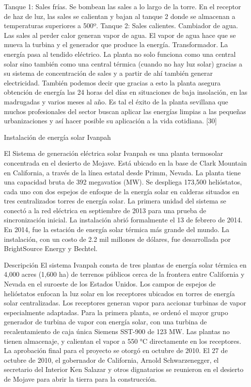 \documentclass[12pt]{article}
\begin{document}
Tanque 1: Sales frías.
Se bombean las sales a lo largo de la torre.
En el receptor de haz de luz, las sales se calientan y bajan al tanque 2 donde se almacenan a temperaturas superiores a 500º.
Tanque 2: Sales calientes.
Cambiador de agua.
Las sales al perder calor generan vapor de agua.
El vapor de agua hace que se mueva la turbina y el generador que produce la energía.
Transformador. La energía pasa al tendido eléctrico.
La planta no solo funciona como una central solar sino también como una central térmica (cuando no hay luz solar) gracias a su sistema de concentración de sales y a partir de ahí también generar electricidad. También podemos decir que gracias a esto la planta asegura obtención de energía las 24 horas del días en situaciones de baja insolación, en las madrugadas y varios meses al año.
Es tal el éxito de la planta sevillana que muchos profesionales del sector buscan aplicar las energías limpias a las pequeñas urbanizaciones y así hacer posible su aplicación a la vida cotidiana. [30]



Instalación de energía solar Ivanpah

El Sistema de generación eléctrica solar Ivanpah es una planta termosolar concentrada en el desierto de Mojave. Está ubicado en la base de Clark Mountain en California, a través de la línea estatal desde Primm, Nevada. La planta tiene una capacidad bruta de 392 megavatios (MW). Se despliega 173,500 helióstatos, cada uno con dos espejos de enfoque de la energía solar en calderas situados en tres centralizados torres de energía solar. La primera unidad del sistema se conectó a la red eléctrica en septiembre de 2013 para una prueba de sincronización inicial. La instalación abrió formalmente el 13 de febrero de 2014. En 2014, fue la estación de energía solar térmica más grande del mundo.
La instalación, con un costo de 2.2 mil millones de dólares, fue desarrollada por BrightSource Energy y Bechtel.
 
Descripción
El sistema Ivanpah consta de tres plantas de energía solar térmica en 4,000 acres (1,600 ha) de terrenos públicos cerca de la frontera entre California y Nevada en el suroeste de los Estados Unidos.
Los campos de espejos de helióstatos enfocan la luz solar en los receptores ubicados en torres de energía solar centralizadas. Los receptores generan vapor para accionar turbinas de vapor especialmente adaptadas.
Para la primera planta, se ordenó el mayor grupo generador de turbina de vapor con energía solar, con una turbina de recalentamiento de caja única Siemens SST-900 de 123 MW. Las plantas no tienen almacenaje, y calientan el vapor a 550 °C directamente en los receptores.
La aprobación final para el proyecto se otorgó en octubre de 2010. El 27 de octubre de 2010, el gobernador de California, Arnold Schwarzenegger, el secretario del Interior Ken Salazar y otros dignatarios se reunieron en el desierto de Mojave para abrir la tierra para la construcción.
 
\end{document}
